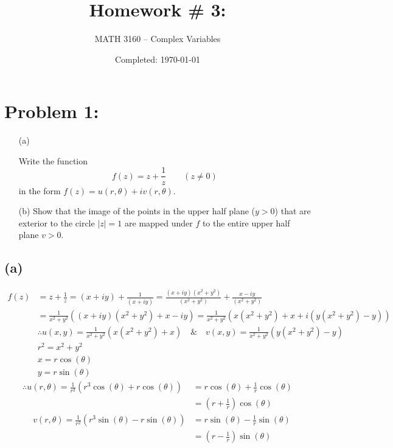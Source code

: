 \documentclass{article}
\title{Homework \# 3: }
\author{
	MATH 3160 -- Complex Variables\\
	\myauthor
}
\date{Completed: \today}
\begin{document}
\maketitle %


\section*{Problem 1: }
\begin{enumerate}
	\item  [(a)]


	      Write the function
	      \[
		      f(z)=z+\frac{1}{z}\qquad (z\neq 0)
	      \]
	      in the form $f(z)=u(r,\theta)+iv(r,\theta)$.

	\item [(b)] Show that the image of the points in the upper half plane ($y>0$) that are exterior to the circle $|z|=1$ are mapped under $f$ to the entire upper half plane $v>0$.
\end{enumerate}

\subsection*{(a)}
\begin{align*}
	f(z) & =z+\frac{1}{z} =  (x+iy)+\frac{1}{(x+iy)}  = \frac{(x+iy)(x^2+y^2)}{(x^2+y^2)} + \frac{x-iy}{(x^2+y^2)}        \\
	     & = \frac{1}{x^2+y^2}((x+iy)(x^2+y^2) + x-iy) = \frac{1}{x^2+y^2}(x(x^2+y^2) + x + i(y(x^2+y^2) - y))            \\
	     & \therefore u(x,y) = \frac{1}{x^2+y^2}(x(x^2+y^2) + x)\quad \& \quad v(x,y) = \frac{1}{x^2+y^2}(y(x^2+y^2) - y) \\
	     & r^2 = x^2 + y^2                                                                                                \\
	     & x = r\cos{(\theta)}                                                                                            \\
	     & y = r\sin{(\theta)}
\end{align*}
\begin{align*}
	\therefore u(r,\theta) = \frac{1}{r^2}(r^3\cos{(\theta)} + r\cos{(\theta)}) & = r\cos{(\theta)} + \frac{1}{r}\cos{(\theta)}        \\
	                                                                            & = \boxed{\left(r + \frac{1}{r}\right)\cos{(\theta)}} \\
	\quad \ v(r,\theta) = \frac{1}{r^2}(r^3\sin{(\theta)} - r\sin{(\theta)})    & = r\sin{(\theta)} - \frac{1}{r}\sin{(\theta)}        \\
	                                                                            & = \boxed{\left(r - \frac{1}{r}\right)\sin{(\theta)}}
\end{align*}
\end{document}
